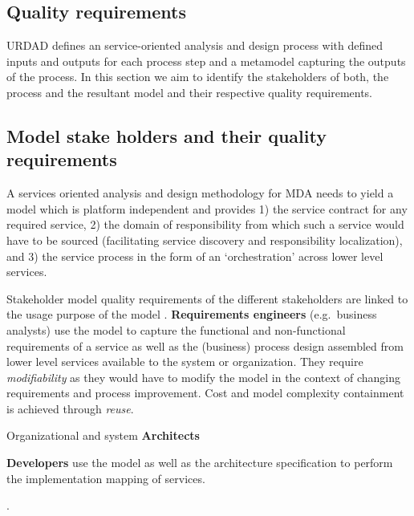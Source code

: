 \subsection{Quality requirements}


URDAD defines an service-oriented analysis and design process with defined inputs and outputs for each process step and a metamodel capturing the outputs of the process. In this section we aim to identify the stakeholders of both, the process and the resultant model and their respective quality requirements.

\subsection{Model stake holders and their quality requirements}

A services oriented analysis and design methodology for MDA needs to yield a model which is platform independent and provides 1) the service contract for any required service, 2) the domain of responsibility from which such a service would have to be sourced (facilitating service discovery and responsibility localization), and 3) the service process in the form of an `orchestration' across lower level services\cite{}.

Stakeholder model quality requirements of the different stakeholders are linked to the usage purpose of the model \cite{lange_christiaan_assessing_2007}. {\bf Requirements engineers} (e.g.\ business analysts) use the model to capture the functional and non-functional requirements of a service as well as the (business) process design assembled from lower level services available to the system or organization. They require \emph{modifiability} as they would have to modify the model in the context of changing requirements and process improvement. Cost and model complexity containment is achieved through \emph{reuse}.

Organizational and system {\bf Architects}

{\bf Developers} use the model as well as the architecture specification to perform the implementation mapping of services.





\cite{lange_managing_2005,lange_improving_2006}.

